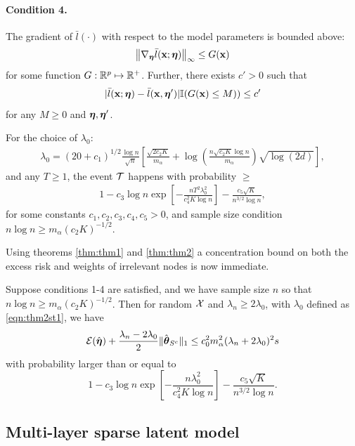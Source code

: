 \documentclass[11pt,letterpaper]{article}
\numberwithin{equation}{section}
\begin{document}
\paragraph{Condition 4.} The gradient of $\bar l(\cdot)$ with respect to the model parameters is bounded above:
%
$$
\left\| \nabla_{\boldsymbol{\eta}} \bar l({\bf{x}}; {\boldsymbol{\eta}}) \right\|_\infty \leq G({\bf{x}})
$$
%
for some function $G: {\mathbb{R}}^p \mapsto {\mathbb{R}}^+$. Further, there exists $c' > 0$ such that
%
$$
| \bar l({\bf{x}}; {\boldsymbol{\eta}}) - \bar l({\bf{x}}, {\boldsymbol{\eta}}')| {\mathbb{I}}(G({\bf{x}}) \leq M)) \leq c'
$$
%
for any $M \geq 0$ and ${\boldsymbol{\eta}}, {\boldsymbol{\eta}}'$.

\begin{Theorem}\label{thm:thm2}
For the choice of $\lambda_0$:
%
\begin{align}\label{eqn:thm2st1}
\lambda_0 = (20 + c_1 )^{1/2} \frac{\log n}{\sqrt n} \left[ \frac{ \sqrt{2 c_2 K}}{m_\alpha} + 
\log \left( \frac{n \sqrt{c_2 K} \log n}{m_\alpha} \right) \sqrt{ \log (2d)} \right],
\end{align}
%
and any $T \geq 1$, the event ${\cal{T}}$ happens with probability $\geq$
%
\begin{align}\label{eqn:thm2st2}
1 - c_3 \log n \exp \left[ - \frac{n T^2 \lambda_0^2 }{ c_4^2 K \log n} \right] - \frac{c_5 \sqrt K}{n^{3/2} \log n},
\end{align}
%
for some constants $c_1, c_2, c_3, c_4, c_5 > 0$, and sample size condition $n \log n \geq m_\alpha (c_2 K)^{-1/2}$.
\end{Theorem}

Using theorems \ref{thm:thm1} and \ref{thm:thm2} a concentration bound on both the excess risk and weights of irrelevant nodes is now immediate.

\begin{Corollary}\label{corollary:cor1}
Suppose conditions 1-4 are satisfied, and we have sample size $n$ so that $n \log n \geq m_\alpha (c_2 K)^{-1/2}$. Then for random ${\cal{X}}$ and $\lambda_n \geq 2 \lambda_0$, with $\lambda_0$ defined as \eqref{eqn:thm2st1}, we have
$$
{\cal{E}}(\hat {{\boldsymbol{\eta}}} ) + \frac{\lambda_n - 2\lambda_0}{2} \| \hat {{\boldsymbol{\theta}}}_{S^c} \|_1 \leq
c_0^2 m_\alpha^2 (\lambda_n + 2\lambda_0)^2 s
$$
%
with probability larger than or equal to
%
$$
1 - c_3 \log n \exp \left[ - \frac{n \lambda_0^2 }{ c_4^2 K \log n} \right] - \frac{c_5 \sqrt K}{n^{3/2} \log n}.
$$
%
\end{Corollary}

\subsection{Multi-layer sparse latent model}
\end{document}
